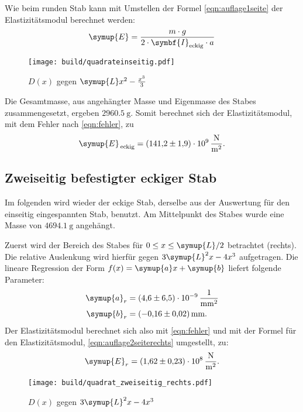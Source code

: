 Wie beim runden Stab kann mit Umstellen der Formel \eqref{eqn:auflage1seite}
der Elastizitätsmodul berechnet werden:
\begin{equation}
  \symup{E} = \frac{m \cdot g}{2 \cdot \symbf{I}_{\text{eckig}} \cdot a}
  \label{eqn:emoduleckig}
\end{equation}

\begin{figure}
  \centering
  \texttt{[image: build/quadrateinseitig.pdf]}
  \caption{$D(x)$ gegen $\symup{L}x^2 - \frac{x^3}{3}$}
  \label{fig:plot2}
\end{figure}

Die Gesamtmasse, aus angehängter Masse und Eigenmasse des Stabes
zusammengesetzt, ergeben $\SI{2960.5}{\gram}$.
Somit berechnet sich der Elastizitätsmodul,
mit dem Fehler nach \eqref{eqn:fehler}, zu
\begin{equation*}
  \symup{E}_{\, \text{eckig}} = \SI{141.2 \pm 1.9 e+9}{\newton\per\meter\squared}.
\end{equation*}

\subsection{Zweiseitig befestigter eckiger Stab}
Im folgenden wird wieder der eckige Stab, derselbe aus der
Auswertung für den einseitig eingespannten Stab, benutzt.
Am Mittelpunkt des Stabes wurde eine Masse von $\SI{4694,1}{\gram}$ angehängt.

Zuerst wird der Bereich des Stabes für $0 \leq x \leq \symup{L}/2$
betrachtet (rechts). Die relative Auslenkung wird hierfür gegen
$3\symup{L}^2x - 4x^3$ aufgetragen.
Die lineare Regression der Form $f(x) = \symup{a}x + \symup{b}$
liefert folgende Parameter:
\begin{align*}
  \symup{a}_{r} &= \SI{4.6(65)e-9}{\per\milli\meter\squared}\\
  \symup{b}_{r} &= \SI{-0.16(02)}{\milli\meter}.
\end{align*}
Der Elastizitätsmodul berechnet sich also mit \eqref{eqn:fehler} und mit der
Formel für den Elastizitätsmodul, \eqref{eqn:auflage2seiterechts} umgestellt,
zu:
\begin{align*}
  \symup{E}_{r} = \SI{1.62(23)e8}{\newton\per\meter\squared}.
\end{align*}
\begin{figure}
  \centering
  \texttt{[image: build/quadrat\_zweiseitig\_rechts.pdf]}
  \caption{$D(x)$ gegen $3\symup{L}^2x - 4x^3$}
  \label{fig:plotrechts}
\end{figure}

